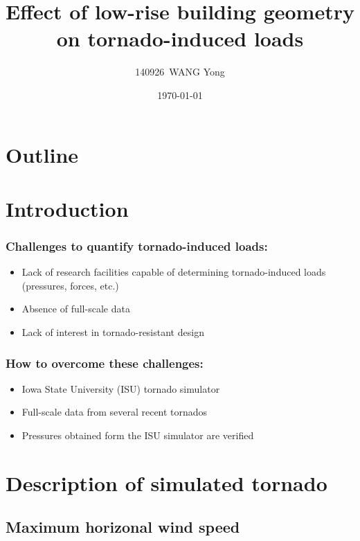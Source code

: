 \documentclass{beamer}
\title{Effect of low-rise building geometry on tornado-induced loads}
\author{140926~WANG Yong}
\institute{Southeast University}
\date{\today}
\begin{document}
\begin{frame}
	\titlepage
\end{frame}

\section*{Outline}
\begin{frame}
	\tableofcontents
\end{frame}

\section{Introduction}

\begin{frame}
    \frametitle{Challenges to quantify  tornado-induced loads:}
    \begin{itemize}
    	\item<1-> Lack of research facilities capable of determining tornado-induced loads (pressures, forces, etc.)
    	\item<2-> Absence of full-scale data
    	\item<3-> Lack of interest in tornado-resistant design
    \end{itemize}
\end{frame}

\begin{frame}
    \frametitle{How to overcome these challenges:}
    \begin{itemize}
    	\item<1-> Iowa State University (ISU) tornado simulator
    	\item<2-> Full-scale data from several recent tornados
    	\item<3-> Pressures obtained form  the ISU simulator are verified
    \end{itemize}
\end{frame}


\section{Description of simulated tornado}
\subsection{Maximum horizonal wind speed}
\end{document}
